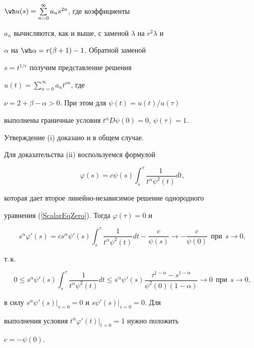 \begin{pf}
$\wh u(s)=\sum\limits_{n=0}^\infty a_ns^{2n}$, где коэффициенты


$a_n$ вычисляются, как и выше, с заменой $\lambda$ на $r^2\lambda$ и


$\alpha$ на $\wh\alpha=r(\beta+1)-1$. Обратной заменой


$s=t^{1/r}$ получим представление решения


$u(t)=\sum\limits_{n=0}^\infty a_nt^{\nu n}$, где


$\nu=2+\beta-\alpha>0$. При этом для $\psi(t)=u(t)/u(\tau)$


выполнены граничные условия $t^\alpha D\psi(0)=0$, $\psi(\tau)=1$.


Утверждение (i) доказано и в общем случае.





Для доказательства (ii) воспользуемся формулой


$$


\varphi(s)=c \psi(s) \int_s^\tau \frac{1}{t^\alpha \psi^2(t)}dt,


$$


которая дает второе линейно-независимое решение однородного


уравнения (\ref{ScalarEqZero}). Тогда $\varphi(\tau)=0$ и


$$


s^\alpha \varphi'(s)=cs^\alpha \psi'(s) \int_s^\tau \frac{1}{t^\alpha


\psi^2(t)}dt-\frac{c}{\psi(s)} \to -\frac{c}{\psi(0)}


\ \ \text{при} \ \ s \to 0,


$$


т.\,к.


$$


0 \le s^\alpha \psi'(s)\int_s^\tau \frac{1}{t^\alpha


\psi^2(t)}dt \le s^\alpha \psi'(s)


\frac{\tau^{1-\alpha}-s^{1-\alpha}}{\psi^2(0)(1-\alpha)} \to 0


\ \ \text{при} \ \ s \to 0,


$$


в силу $s^\alpha \psi'(s)|_{s=0}=0$ и $s\psi'(s)|_{s=0}=0$. Для


выполнения условия $t^\alpha \varphi'(t)|_{t=0}=1$ нужно положить


$c=-\psi(0)$.


\end{pf}





